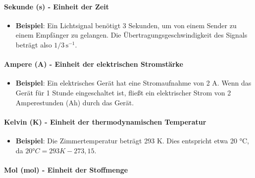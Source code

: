 \documentclass{vorlage-design-main}
\begin{document}
\hypertarget{sekunde-s---einheit-der-zeit}{%
\paragraph{Sekunde (s) - Einheit der
Zeit}\label{sekunde-s---einheit-der-zeit}}

\begin{itemize}

\item
  \textbf{Beispiel}: Ein Lichtsignal benötigt 3 Sekunden, um von einem
  Sender zu einem Empfänger zu gelangen. Die Übertragungsgeschwindigkeit
  des Signals beträgt also $1 / 3 \, \text{s}^{-1}$.
\end{itemize}

\hypertarget{ampere-a---einheit-der-elektrischen-stromstuxe4rke}{%
\paragraph{Ampere (A) - Einheit der elektrischen
Stromstärke}\label{ampere-a---einheit-der-elektrischen-stromstaerke}}

\begin{itemize}

\item
  \textbf{Beispiel}: Ein elektrisches Gerät hat eine Stromaufnahme von 2
  A. Wenn das Gerät für 1 Stunde eingeschaltet ist, fließt ein
  elektrischer Strom von 2 Amperestunden (Ah) durch das Gerät.
\end{itemize}

\hypertarget{kelvin-k---einheit-der-thermodynamischen-temperatur}{%
\paragraph{Kelvin (K) - Einheit der thermodynamischen
Temperatur}\label{kelvin-k---einheit-der-thermodynamischen-temperatur}}

\begin{itemize}

\item
  \textbf{Beispiel}: Die Zimmertemperatur beträgt 293 K. Dies entspricht
  etwa 20 °C, da $20 °C = 293 K - 273,15$.
\end{itemize}

\hypertarget{mol-mol---einheit-der-stoffmenge}{%
\paragraph{Mol (mol) - Einheit der
Stoffmenge}\label{mol-mol---einheit-der-stoffmenge}}
\end{document}
